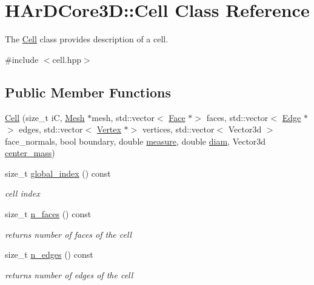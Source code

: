 \hypertarget{classHArDCore3D_1_1Cell}{}\section{H\+Ar\+D\+Core3D\+:\+:Cell Class Reference}
\label{classHArDCore3D_1_1Cell}


The \hyperlink{classHArDCore3D_1_1Cell}{Cell} class provides description of a cell.  




{\ttfamily \#include $<$cell.\+hpp$>$}

\subsection*{Public Member Functions}
\begin{DoxyCompactItemize}
\item 
\hyperlink{classHArDCore3D_1_1Cell_a2597fe51e5bcff42de23aeeac4d2e8d7}{Cell} (size\+\_\+t iC, \hyperlink{classHArDCore3D_1_1Mesh}{Mesh} $\ast$mesh, std\+::vector$<$ \hyperlink{classHArDCore3D_1_1Face}{Face} $\ast$$>$ faces, std\+::vector$<$ \hyperlink{classHArDCore3D_1_1Edge}{Edge} $\ast$$>$ edges, std\+::vector$<$ \hyperlink{classHArDCore3D_1_1Vertex}{Vertex} $\ast$$>$ vertices, std\+::vector$<$ Vector3d $>$ face\+\_\+normals, bool boundary, double \hyperlink{group__Mesh_ga75b939b8edadf100a35b9c7298fb5c8b}{measure}, double \hyperlink{group__Mesh_ga02b7103a8ceae610aa213334a6a1277d}{diam}, Vector3d \hyperlink{group__Mesh_ga3eb9c83b9578d3d93e94a698c37a980e}{center\+\_\+mass})
\item 
size\+\_\+t \hyperlink{group__Mesh_ga76cf6e2785020ff1cc8ec51bf4d232c5}{global\+\_\+index} () const
\begin{DoxyCompactList}\small\item\em cell index \end{DoxyCompactList}\item 
size\+\_\+t \hyperlink{group__Mesh_ga805584b31ee6aa7f6725075d8d16a744}{n\+\_\+faces} () const
\begin{DoxyCompactList}\small\item\em returns number of faces of the cell \end{DoxyCompactList}\item 
size\+\_\+t \hyperlink{group__Mesh_gad38d3b73d9e4aadcad92824c6a68d11b}{n\+\_\+edges} () const
\begin{DoxyCompactList}\small\item\em returns number of edges of the cell \end{DoxyCompactList}\item 
$$
\end{DoxyCompactItemize}
